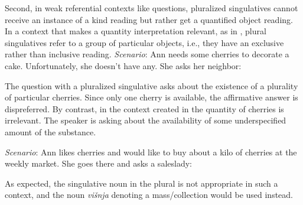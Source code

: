 \documentclass[output=paper,colorlinks,citecolor=brown]{langscibook}
\begin{document}
\noindent Second, in weak referential contexts like questions, pluralized singulatives cannot receive an instance of a kind reading but rather get a quantified object reading. In a context that makes a quantity interpretation relevant, as in , plural singulatives refer to a group of particular objects, i.e., they have an exclusive rather than inclusive reading.
\eanoraggedright\label{ex:geist:28} \textit{Scenario}: Ann needs some cherries to decorate a cake. Unfortunately, she doesn't have any. She asks her neighbor:
\begin{xlist}
\label{ex:geist:28A:}
\label{ex:geist:28B:}
\end{xlist}
\z

\noindent The question with a pluralized singulative asks about the existence of a plurality of particular cherries. Since only one cherry is available, the affirmative answer is dispreferred. By contrast, in the context created in  the quantity of cherries is irrelevant. The speaker is asking about the availability of some underspecified amount of the substance.

\eanoraggedright\label{ex:geist:29} \textit{Scenario}: Ann likes cherries and would like to buy about a kilo of cherries at the weekly market. She goes there and asks a saleslady:
\begin{xlist}
\end{xlist}
\z

\noindent As expected, the singulative noun in the plural is not appropriate in such a context, and the noun \textit{višnja} denoting a mass/collection would be used instead. 
\end{document}
